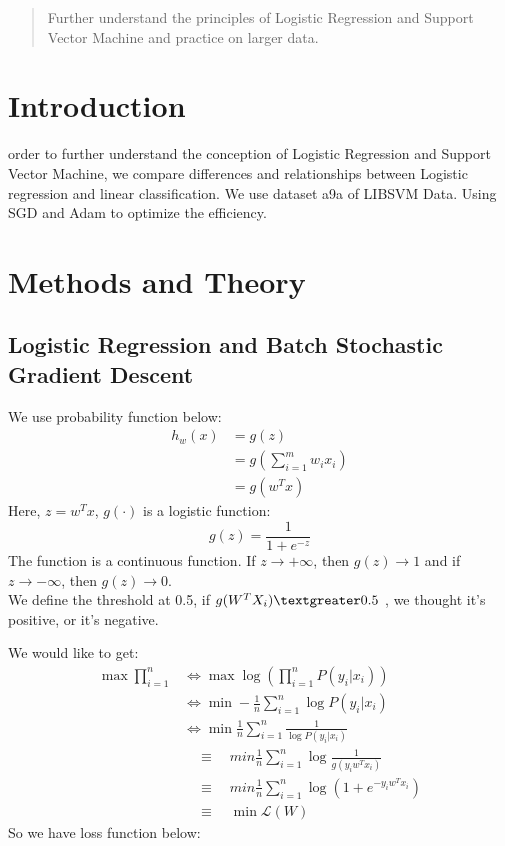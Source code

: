 \documentclass[journal, a4paper]{IEEEtran}
\begin{document}
\begin{abstract}
Further understand the principles of Logistic Regression and Support Vector Machine and practice on larger data.
\end{abstract}

\section{Introduction}
 order to further understand the conception of Logistic Regression and Support Vector Machine, we compare differences and relationships between Logistic regression and linear classification. We use dataset a9a of LIBSVM Data. Using SGD and Adam to optimize the efficiency.

\section{Methods and Theory}
\subsection{Logistic Regression and Batch Stochastic Gradient Descent}
We use probability function below:
\begin{equation}
	\begin{aligned}
	\nonumber
		h_w(x)&=g(z)\\
		&=g(\sum_{i=1}^mw_ix_i)\\
		&=g(w^Tx)
	\end{aligned}
\end{equation}
Here, $z=w^Tx$, $g(\cdot)$ is a logistic function:
$$g(z)=\frac{1}{1+e^{-z}} $$
The function is a continuous function. If $z\to+\infty$, then $g(z)\to1$ and if $z\to-\infty$, then $g(z)\to0$.\\
We define the threshold at 0.5, if $g(W^T X_i) \textgreater 0.5$ , we thought it's positive, or it's negative.\par
We would like to get:
\begin{equation}
	\begin{aligned}
	\nonumber
		\max\prod_{i=1}^n & \iff \max \log(\prod_{i=1}^nP(y_i|x_i))\\
		& \iff \min-\frac{1}{n}\sum_{i=1}^n\log P(y_i|x_i)\\
		& \iff  \min\frac{1}{n}\sum_{i=1}^n\frac{1}{\log P(y_i|x_i)}\\
		& \quad \equiv \quad min \frac{1}{n}\sum_{i=1}^n\log\frac{1}{g(y_iw^Tx_i)}\\
		& \quad \equiv \quad min \frac{1}{n}\sum_{i=1}^n\log(1+e^{-y_iw^Tx_i})\\
		& \quad \equiv \quad \min\mathcal{L}(W)
	\end{aligned}
\end{equation}
So we have loss function below:
\end{document}
